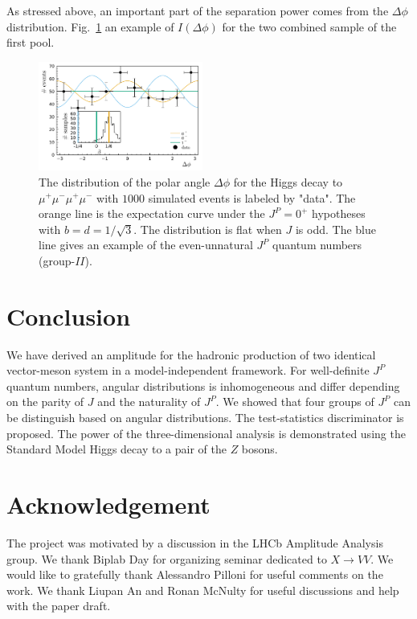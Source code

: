 \documentclass[prd,preprintnumbers,floatfix,
nofootinbib,superscriptaddress]{revtex4}
\newcommand{\II}{\ensuremath{{I\!I}}}
\begin{document}
As stressed above, an important part of the separation power comes from the $\Delta\phi$ distribution.
Fig.~\ref{fig:higgs.phi} an example of $I(\Delta\phi)$ for the two combined sample of the first pool.
\begin{figure}
  \includegraphics[width=0.48\textwidth]{phi_higgs.pdf}
  \caption{The distribution of the polar angle $\Delta\phi$ for the Higgs decay to $\mu^+\mu^-\mu^+\mu^-$ with $1000$ simulated events is labeled by "data".
  The orange line is the expectation curve under the $J^P=0^+$ hypotheses with $b=d=1/\sqrt{3}$.
  The distribution is flat when $J$ is odd.
  The blue line gives an example of the even-unnatural $J^P$ quantum numbers (group-\II).}
  \label{fig:higgs.phi}
\end{figure}

\section{Conclusion}
We have derived an amplitude for the hadronic production of two identical vector-meson system in a model-independent framework.
For well-definite $J^P$ quantum numbers, angular distributions is inhomogeneous
and differ depending on the parity of $J$ and the naturality of $J^P$.
We showed that four groups of $J^P$ can be distinguish based on angular distributions.
The test-statistics discriminator is proposed.
The power of the three-dimensional analysis is demonstrated using the Standard Model Higgs decay to a pair of the $Z$ bosons.

\section*{Acknowledgement}
The project was motivated by a discussion in the LHCb Amplitude Analysis group.
We thank Biplab Day for organizing seminar dedicated to $X\to VV$.
We would like to gratefully thank Alessandro Pilloni for useful comments on the work.
We thank Liupan An and Ronan McNulty for useful discussions and help with the paper draft.

\appendix
\end{document}
